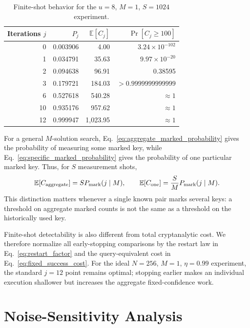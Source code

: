 \documentclass[10pt,a4paper]{article}
\newcommand{\E}{\mathbb{E}}
\begin{document}
\begin{table}[H]
\centering
\caption{Finite-shot behavior for the $u=8$, $M=1$, $S=1024$ experiment.}
\label{tab:finite}
\begin{tabular}{rrrr}
\toprule
Iterations $j$ & $P_j$ & $\E[C_j]$ & $\Pr[C_j\ge100]$\\
\midrule
0 & 0.003906 & 4.00 & $3.24\times10^{-102}$\\
1 & 0.034791 & 35.63 & $9.97\times10^{-20}$\\
2 & 0.094638 & 96.91 & 0.38595\\
3 & 0.179721 & 184.03 & $>0.9999999999999$\\
6 & 0.527618 & 540.28 & $\approx1$\\
10 & 0.935176 & 957.62 & $\approx1$\\
12 & 0.999947 & 1,023.95 & $\approx1$\\
\bottomrule
\end{tabular}
\end{table}

For a general $M$-solution search, Eq.~\eqref{eq:aggregate_marked_probability} gives the probability of measuring some marked key, while Eq.~\eqref{eq:specific_marked_probability} gives the probability of one particular marked key.  Thus, for $S$ measurement shots,
\begin{equation}
    \E[C_{\rm aggregate}]=S P_{\rm mark}(j\mid M),
    \qquad
    \E[C_{\rm one}]=\frac{S}{M}P_{\rm mark}(j\mid M).
\end{equation}
This distinction matters whenever a single known pair marks several keys: a threshold on aggregate marked counts is not the same as a threshold on the historically used key.

Finite-shot detectability is also different from total cryptanalytic cost.  We therefore normalize all early-stopping comparisons by the restart law in Eq.~\eqref{eq:restart_factor} and the query-equivalent cost in Eq.~\eqref{eq:fixed_success_cost}.  For the ideal $N=256$, $M=1$, $\eta=0.99$ experiment, the standard $j=12$ point remains optimal; stopping earlier makes an individual execution shallower but increases the aggregate fixed-confidence work.

\section{Noise-Sensitivity Analysis}
\end{document}
